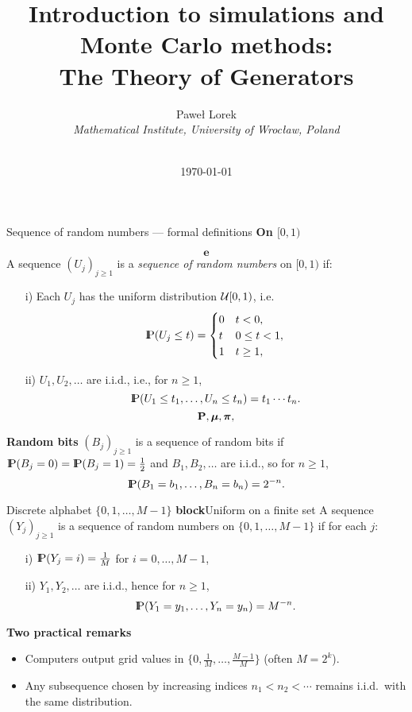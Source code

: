 \documentclass[aspectratio=169]{beamer}
\newcommand{\Prob}{{\rm I\hspace{-0.8mm}P}}
\newcommand{\e}[0]{\textbf{e}}
\begin{document}
 

\title{Introduction to simulations and Monte Carlo methods:
\\ The Theory of Generators}
\author{Pawe{\l} Lorek  \\ \textsl{Mathematical Institute, University of Wroc{\l}aw, Poland} \\
\ \\
}


\date{\today}

\frame{\titlepage} 


\begin{frame}{Sequence of random numbers — formal definitions}
\textbf{On $[0,1)$}

$$\e$$
A sequence $(U_j)_{j\ge 1}$ is a \textsl{sequence of random numbers} on $[0,1)$ if:
\begin{enumerate}
  \item[i)] Each $U_j$ has the uniform distribution ${\cal U}[0,1)$, i.e.
  \[
    \Prob(U_j \le t) =
    \begin{cases}
      0 & t<0,\\
      t & 0\le t<1,\\
      1 & t\ge 1,
    \end{cases}
  \]
  \item[ii)] $U_1,U_2,\ldots$ are i.i.d., i.e., for $n\ge 1$,
  \[
    \Prob(U_1\le t_1,\ldots,U_n\le t_n)=t_1\cdots t_n .
  \]
  $$\mathbf{P},\mbox{\boldmath $\mu$}, \mbox{\boldmath$\pi$},   $$
\end{enumerate}


\smallskip
\textbf{Random bits}
$(B_j)_{j\ge 1}$ is a sequence of random bits if
$\Prob(B_j=0)=\Prob(B_j=1)=\tfrac12$ and $B_1,B_2,\ldots$ are i.i.d., so for $n\ge 1$,
\[
  \Prob(B_1=b_1,\ldots,B_n=b_n)=2^{-n}.
\]

\end{frame}

\begin{frame}{Discrete alphabet $\{0,1,\ldots,M-1\}$}
\textbf{block}{Uniform on a finite set}
A sequence $(Y_j)_{j\ge 1}$ is a sequence of random numbers on
$\{0,1,\ldots,M-1\}$ if for each $j$:
\begin{enumerate}
  \item[i)] $\Prob(Y_j=i)=\tfrac1M$ for $i=0,\ldots,M-1$,
  \item[ii)] $Y_1,Y_2,\ldots$ are i.i.d., hence for $n\ge 1$,
  \[
    \Prob(Y_1=y_1,\ldots,Y_n=y_n)=M^{-n}.
  \]
\end{enumerate}


\smallskip
\textbf{Two practical remarks}
\begin{itemize}
  \item Computers output grid values in $\{0,\tfrac1M,\ldots,\tfrac{M-1}{M}\}$ (often $M=2^k$).
  \item Any subsequence chosen by increasing indices $n_1<n_2<\cdots$ remains i.i.d.\ with the same distribution.
\end{itemize}

\end{frame}
\end{document}
